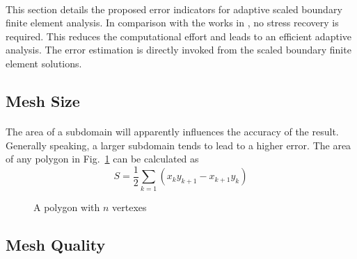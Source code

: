 \paragraph{}
This section details the proposed error indicators for adaptive scaled boundary finite element analysis.
In comparison with the works in \citep{NME:NME439}, no stress recovery is required.
This reduces the computational effort and leads to an efficient adaptive analysis.
The error estimation is directly invoked from the scaled boundary finite element solutions.

\subsection{Mesh Size}
\paragraph{}
The area of a subdomain will apparently influences the accuracy of the result.
Generally speaking, a larger subdomain tends to lead to a higher error.
The area of any polygon in Fig.~\ref{adap_fig:ei_polygon} can be calculated as 
%
\begin{equation}
    S = \frac{1}{2}
        \sum_{k=1}
        \left(
            x_k y_{k+1} - x_{k+1} y_k
        \right)
\end{equation}
%
\begin{figure}[h!]
    \centering
    \caption{A polygon with $n$ vertexes}
    \label{adap_fig:ei_polygon}
\end{figure}
%
\subsection{Mesh Quality}
